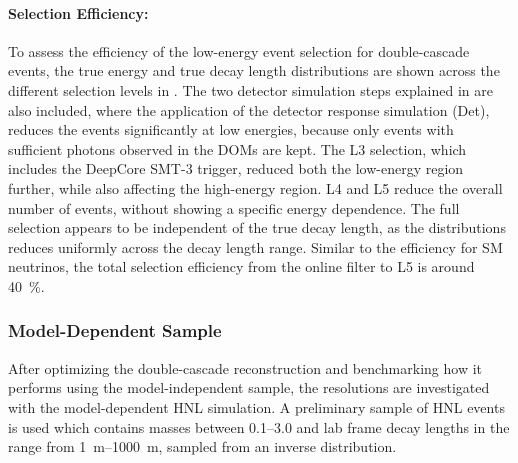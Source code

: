 \paragraph{Selection Efficiency:}

To assess the efficiency of the low-energy event selection for double-cascade events, the true energy and true decay length distributions are shown across the different selection levels in . The two detector simulation steps explained in  are also included, where the application of the detector response simulation (Det), reduces the events significantly at low energies, because only events with sufficient photons observed in the DOMs are kept. The L3 selection, which includes the DeepCore SMT-3 trigger, reduced both the low-energy region further, while also affecting the high-energy region. L4 and L5 reduce the overall number of events, without showing a specific energy dependence. The full selection appears to be independent of the true decay length, as the distributions reduces uniformly across the decay length range. Similar to the efficiency for SM neutrinos, the total selection efficiency from the online filter to L5 is around \SI{40}{\percent}.




\subsubsection{Model-Dependent Sample}

After optimizing the double-cascade reconstruction and benchmarking how it performs using the model-independent sample, the resolutions are investigated with the model-dependent HNL simulation. A preliminary sample of HNL events is used which contains masses between \SIrange[range-phrase=~and~]{0.1}{3.0}{\gev} and lab frame decay lengths in the range from \SIrange{1}{1000}{\meter}, sampled from an inverse distribution.

